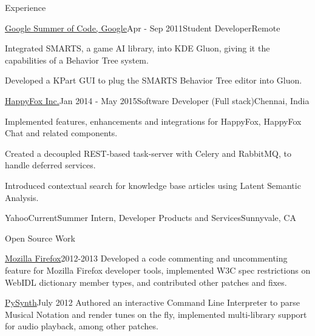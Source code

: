 \documentclass{resume} %
\begin{document}
\begin{rSection}{Experience}
\vspace{2mm}

\begin{rSubsection}{\href{https://www.google-melange.com/gsoc/project/details/google/gsoc2011/pranavrc/5757334940811264}{Google Summer of Code, Google}}{Apr - Sep 2011}{Student Developer}{Remote}
\item Integrated SMARTS, a game AI library, into KDE Gluon, giving it the capabilities of a Behavior Tree system.
\item Developed a KPart GUI to plug the SMARTS Behavior Tree editor into Gluon.
\end{rSubsection}


\begin{rSubsection}{\href{https://happyfox.com/}{HappyFox Inc.}}{Jan 2014 - May 2015}{Software Developer (Full stack)}{Chennai, India}
\item Implemented features, enhancements and integrations for HappyFox, HappyFox Chat and related components.
\item Created a decoupled REST-based task-server with Celery and RabbitMQ, to handle deferred services.
\item Introduced contextual search for knowledge base articles using Latent Semantic Analysis.
\end{rSubsection}


\begin{rSubsection}{Yahoo}{Current}{Summer Intern, Developer Products and Services}{Sunnyvale, CA}
\end{rSubsection}

\end{rSection}


\begin{rSection}{Open Source Work}
\vspace{2mm}

\begin{rSubsection}{\href{https://bugzilla.mozilla.org/user\%5Fprofile?user\%5Fid=431664}{Mozilla Firefox}}{2012-2013}{}{}
Developed a code commenting and uncommenting feature for Mozilla Firefox developer tools, implemented W3C spec restrictions on WebIDL dictionary member types, and contributed other patches and fixes.
\end{rSubsection}

\begin{rSubsection}{\href{https://github.com/mdoege/PySynth/commits?author=pranavrc}{PySynth}}{July 2012}{}{}
Authored an interactive Command Line Interpreter to parse Musical Notation and render tunes on the fly, implemented multi-library support for audio playback, among other patches.
\end{rSubsection}

\end{rSection}
\end{document}
